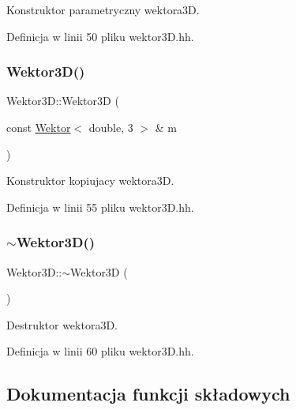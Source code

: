 Konstruktor parametryczny wektora3D. 

Definicja w linii 50 pliku wektor3\+D.\+hh.

\mbox{\label{class_wektor3_d_a2214f63869d47df6ef839b4c21fc7ec5}} 
\subsubsection{\texorpdfstring{Wektor3D()}{Wektor3D()}\hspace{0.1cm}{\footnotesize\ttfamily [4/4]}}
{\footnotesize\ttfamily Wektor3\+D\+::\+Wektor3D (\begin{DoxyParamCaption}\item[{const \mbox{\hyperlink{class_wektor}{Wektor}}$<$ double, 3 $>$ \&}]{m }\end{DoxyParamCaption})\hspace{0.3cm}{\ttfamily [inline]}}

Konstruktor kopiujacy wektora3D. 

Definicja w linii 55 pliku wektor3\+D.\+hh.

\mbox{\label{class_wektor3_d_af82ae24a30f6c4391edd67647348ac04}} 
\subsubsection{\texorpdfstring{$\sim$Wektor3D()}{~Wektor3D()}}
{\footnotesize\ttfamily Wektor3\+D\+::$\sim$\+Wektor3D (\begin{DoxyParamCaption}{ }\end{DoxyParamCaption})\hspace{0.3cm}{\ttfamily [inline]}}

Destruktor wektora3D. 

Definicja w linii 60 pliku wektor3\+D.\+hh.



\subsection{Dokumentacja funkcji składowych}
\mbox{\label{class_wektor3_d_a35bade70d5d9200b5e4fab3e7726f4c8}} 
